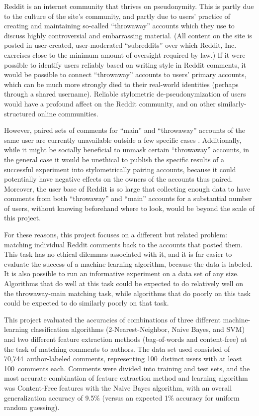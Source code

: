 \documentclass[12pt]{article}
\begin{document}
Reddit is an internet community that thrives on pseudonymity. This is partly due to the culture of the site's community, and partly due to users' practice of creating and maintaining so-called ``throwaway'' accounts which they use to discuss highly controversial and embarrassing material. (All content on the site is posted in user-created, user-moderated ``subreddits'' over which Reddit, Inc. exercises close to the minimum amount of oversight required by law.) If it were possible to identify users reliably based on writing style in Reddit comments, it would be possible to connect ``throwaway'' accounts to users' primary accounts, which can be much more strongly died to their real-world identities (perhaps through a shared username). Reliable stylometric de-pseudonymization of users would have a profound affect on the Reddit community, and on other similarly-structured online communities.

However, paired sets of comments for ``main'' and ``throwaway'' accounts of the same user are currently unavailable outside a few specific cases \cite{chen2012unmasking, fitzpatrick2012man}. Additionally, while it might be socially beneficial to unmask certain ``throwaway'' accounts, in the general case it would be unethical to publish the specific results of a successful experiment into stylometrically pairing accounts, because it could potentially have negative effects on the owners of the accounts thus paired. Moreover, the user base of Reddit is so large that collecting enough data to have comments from both ``throwaway'' and ``main'' accounts for a substantial number of users, without knowing beforehand where to look, would be beyond the scale of this project.

For these reasons, this project focuses on a different but related problem: matching individual Reddit comments back to the accounts that posted them. This task has no ethical dilemmas associated with it, and it is far easier to evaluate the success of a machine learning algorithm, because the data is labeled. It is also possible to run an informative experiment on a data set of any size. Algorithms that do well at this task could be expected to do relatively well on the throwaway-main matching task, while algorithms that do poorly on this task could be expected to do similarly poorly on that task.

This project evaluated the accuracies of combinations of three different machine-learning classification algorithms (2-Nearest-Neighbor, Naive Bayes, and SVM) and two different feature extraction methods (bag-of-words and content-free) at the task of matching comments to authors. The data set used consisted of 70,744~author-labeled comments, representing 100~distinct users with at least 100~comments each. Comments were divided into training and test sets, and the most accurate combination of feature extraction method and learning algorithm was Content-Free features with the Naive Bayes algorithm, with an overall generalization accuracy of 9.5\% (versus an expected 1\% accuracy for uniform random guessing). 
\end{document}
